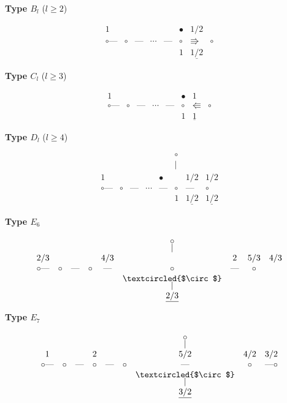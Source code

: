 \documentclass[12pt,a4paper]{article}
\theoremstyle{plain}
\theoremstyle{definition}
\theoremstyle{remark}
\begin{document}
\begin{center}
\textbf{Type $B_l$} ($l \ge 2$)
\end{center}
\[
\begin{array}{cccccccc}
1 &&&&& \bullet & 1/2 \\
\circ \text{---} & \circ & \text{---} & \cdots & \text{---} & \circ & \Rrightarrow & \circ \\
&&&&& 1 & \underline{1/2}
\end{array}
\]

\begin{center}
\textbf{Type $C_l$} ($l \ge 3$)
\end{center}
\[
\begin{array}{cccccccc}
1 &&&&& \bullet & 1 \\
\circ \text{---} & \circ & \text{---} & \cdots & \text{---} & \circ & \Lleftarrow & \circ \\
&&&&& 1 & \underline{1}
\end{array}
\]

\begin{center}
\textbf{Type $D_l$} ($l \ge 4$)
\end{center}
\[
\begin{array}{ccccccccc}
&&&&& \circ \\[-4pt]
&&&&& | \\
1 &&&& \bullet && 1/2 & 1/2 \\
\circ \text{---} & \circ & \text{---} & \cdots & \text{---} & \circ & \text{---} & \circ \\
&&&&& 1 & \underline{1/2} & \underline{1/2}
\end{array}
\]

\begin{center}
\textbf{Type $E_6$}
\end{center}
\[
\begin{array}{cccccccccc}
&&&&& \circ \\[-4pt]
&&&&& | \\
2/3 &&&& 4/3 && 2 & 5/3 & 4/3 \\
\circ \text{---} & \circ & \text{---} & \circ & \text{---} & \circ & \text{---} & \circ \\
&&&&& \textcircled{$\circ$} \\[-4pt]
&&&&& | \\
&&&&& \underline{2/3}
\end{array}
\]

\begin{center}
\textbf{Type $E_7$}
\end{center}
\[
\begin{array}{ccccccccccc}
&&&&&& \circ \\[-4pt]
&&&&&& | \\
1 &&& 2 &&& 5/2 & 4/2 & 3/2 \\
\circ \text{---} & \circ & \text{---} & \circ & \text{---} & \circ & \text{---} & \circ & \text{---} \circ \\
&&&&&& \textcircled{$\circ$} \\[-4pt]
&&&&&& | \\
&&&&&& \underline{3/2}
\end{array}
\]
\end{document}
